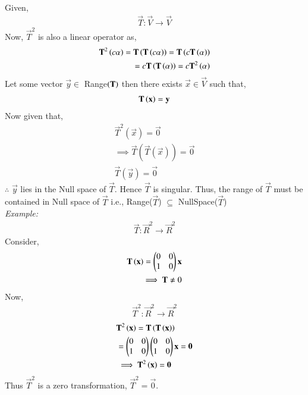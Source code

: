 Given, 
\begin{align}
    \vec{T} : \vec{V} \xrightarrow{} \vec{V}
\end{align}
Now, $\vec{T}^2$ is also a linear operator as,
\begin{align}
    \mathbf{T}^2\left(c\alpha\right) = \mathbf{T}\left(\mathbf{T}\left(c\alpha\right)\right) = \mathbf{T}\left(c\mathbf{T}\left(\alpha\right)\right) \\
    = c\mathbf{T}\left(\mathbf{T}\left(\alpha\right)\right) = c\mathbf{T}^2\left(\alpha\right) 
\end{align}
Let some vector $\vec{y}\in $ Range$\left(\mathbf{T}\right)$ then there exists $\vec{x} \in \vec{V}$ such that,
\begin{align}
    \mathbf{T}\left(\mathbf{x}\right) = \mathbf{y}
\end{align}
Now given that,
\begin{align}
    \vec{T}^2(\vec{x}) = \vec{0} \\
    \implies \vec{T}(\vec{T}(\vec{x})) = \vec{0}\\
    \vec{T}(\vec{y}) = \vec{0}
\end{align}
$\therefore$ $\vec{y}$ lies in the Null space of $\vec{T}$. Hence $\vec{T}$ is singular. Thus, the range of $\vec{T}$ must be contained in Null space of $\vec{T}$ i.e.,
Range($\vec{T}$) $\subseteq$ NullSpace($\vec{T}$)
\\
{\em Example: }
\begin{align}
    \vec{T} : \vec{R}^2 \xrightarrow{} \vec{R}^2
\end{align}
Consider, 
\begin{align}
    \mathbf{T}\left(\mathbf{x}\right) = \begin{pmatrix}0&0\\1&0\end{pmatrix}\mathbf{x} \\
    \implies \mathbf{T} \ne 0 \label{eq:solutions/3/2/8/t}
\end{align}
Now,
\begin{align}
    \vec{T}^2 : \vec{R}^2 \xrightarrow{} \vec{R}^2
\end{align}
\begin{align}
    &\mathbf{T}^2\left(\mathbf{x}\right) = \mathbf{T}\left(\mathbf{T}\left(\mathbf{x}\right)\right) \\
    &= \begin{pmatrix}0&0\\1&0\end{pmatrix}\begin{pmatrix}0&0\\1&0\end{pmatrix}\mathbf{x} = \mathbf{0} \\
    &\implies \mathbf{T}^2\left(\mathbf{x}\right) = \mathbf{0} \label{eq:solutions/3/2/8/t2}
\end{align}
Thus $\vec{T}^2$ is a zero transformation, $\vec{T}^2 = \vec{0}$.

